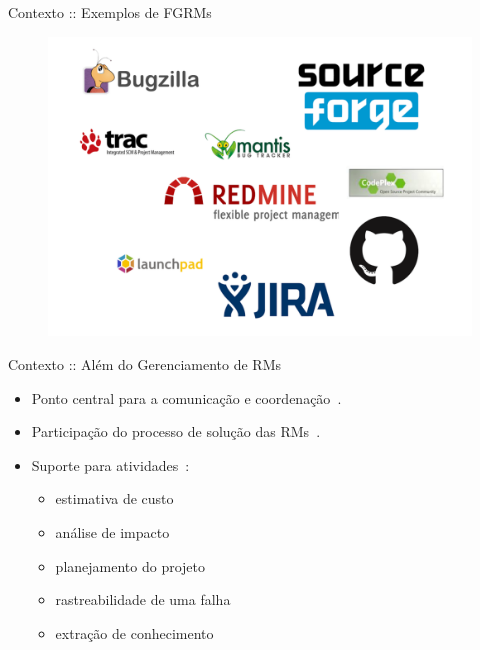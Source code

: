 \documentclass[t,14pt,mathserif]{beamer}
\begin{document}
\begin{frame}{Contexto :: Exemplos de FGRMs}
		\begin{figure}[hbtp]
			\centering
			\includegraphics[scale=.3]{../img/issue-tracking-sytem.png}
		\end{figure}
\end{frame}

\begin{frame}{Contexto :: Além do Gerenciamento de RMs}
	\begin{itemize}
        \item Ponto central para a comunicação e
              coordenação~\cite{Bertram:2010:CCB:1718918.1718972}.
        \item Participação do processo de solução das
              RMs~\cite{Breu:2010:INB:1718918.1718973}.
        \item Suporte para atividades~\cite{cavalcanti2013bug}:
            \begin{itemize}
                \item estimativa de custo
                \item análise de impacto
                \item planejamento do projeto
                \item rastreabilidade de uma falha
                \item extração de conhecimento
            \end{itemize}
      \end{itemize}
\end{frame}
\end{document}
